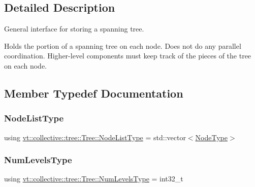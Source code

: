 \subsection{Detailed Description}
General interface for storing a spanning tree. 

Holds the portion of a spanning tree on each node. Does not do any parallel coordination. Higher-\/level components must keep track of the pieces of the tree on each node. 

\subsection{Member Typedef Documentation}
\mbox{\label{structvt_1_1collective_1_1tree_1_1_tree_a834e7b54ea2dceae42db7c5ea859753f}} 
\subsubsection{\texorpdfstring{Node\+List\+Type}{NodeListType}}
{\footnotesize\ttfamily using \hyperlink{structvt_1_1collective_1_1tree_1_1_tree_a834e7b54ea2dceae42db7c5ea859753f}{vt\+::collective\+::tree\+::\+Tree\+::\+Node\+List\+Type} =  std\+::vector$<$\hyperlink{namespacevt_a866da9d0efc19c0a1ce79e9e492f47e2}{Node\+Type}$>$}

\mbox{\label{structvt_1_1collective_1_1tree_1_1_tree_af64acc9543dc1bd1b56d6ed17b003425}} 
\subsubsection{\texorpdfstring{Num\+Levels\+Type}{NumLevelsType}}
{\footnotesize\ttfamily using \hyperlink{structvt_1_1collective_1_1tree_1_1_tree_af64acc9543dc1bd1b56d6ed17b003425}{vt\+::collective\+::tree\+::\+Tree\+::\+Num\+Levels\+Type} =  int32\+\_\+t}

\mbox{\label{structvt_1_1collective_1_1tree_1_1_tree_a5ce4242e9580c807baa74168401f381a}} 

